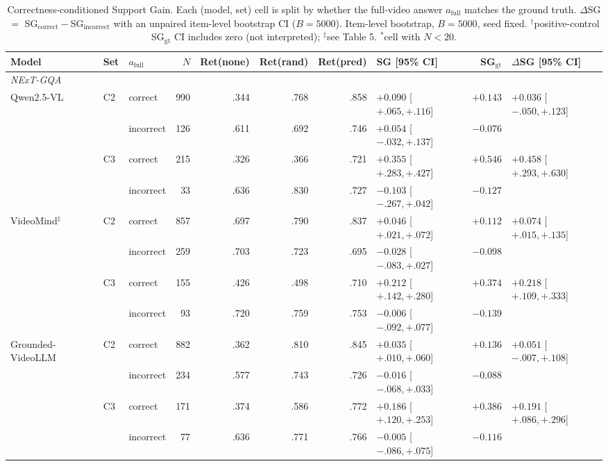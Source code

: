 \begin{table}[t]
\centering
\scriptsize
\setlength{\tabcolsep}{4pt}
\caption{Correctness-conditioned Support Gain. Each (model, set) cell is split by whether the full-video answer $a_{\text{full}}$ matches the ground truth. $\Delta$SG $=$ SG$_{\text{correct}}-$SG$_{\text{incorrect}}$ with an unpaired item-level bootstrap CI ($B{=}5000$). Item-level bootstrap, $B{=}5000$, seed fixed. $^{\dagger}$positive-control SG$_{\text{gt}}$ CI includes zero (not interpreted); $^{\ddagger}$see Table 5. $^{\ast}$cell with $N<20$.}
\label{tab:a1_correctness_conditioned}
\begin{tabular}{lllrrrrlrl}
\toprule
Model & Set & $a_{\text{full}}$ & $N$ & Ret(none) & Ret(rand) & Ret(pred) & SG [95\% CI] & SG$_{\text{gt}}$ & $\Delta$SG [95\% CI] \\
\midrule
\multicolumn{10}{l}{\textit{NExT-GQA}} \\
Qwen2.5-VL & C2 & correct & 990 & .344 & .768 & .858 & $+0.090$ [$+.065,+.116$] & $+0.143$ & $+0.036$ [$-.050,+.123$] \\
 &  & incorrect & 126 & .611 & .692 & .746 & $+0.054$ [$-.032,+.137$] & $-0.076$ &  \\
 & C3 & correct & 215 & .326 & .366 & .721 & $+0.355$ [$+.283,+.427$] & $+0.546$ & $+0.458$ [$+.293,+.630$] \\
 &  & incorrect & 33 & .636 & .830 & .727 & $-0.103$ [$-.267,+.042$] & $-0.127$ &  \\
\addlinespace
VideoMind$^{\ddagger}$ & C2 & correct & 857 & .697 & .790 & .837 & $+0.046$ [$+.021,+.072$] & $+0.112$ & $+0.074$ [$+.015,+.135$] \\
 &  & incorrect & 259 & .703 & .723 & .695 & $-0.028$ [$-.083,+.027$] & $-0.098$ &  \\
 & C3 & correct & 155 & .426 & .498 & .710 & $+0.212$ [$+.142,+.280$] & $+0.374$ & $+0.218$ [$+.109,+.333$] \\
 &  & incorrect & 93 & .720 & .759 & .753 & $-0.006$ [$-.092,+.077$] & $-0.139$ &  \\
\addlinespace
Grounded-VideoLLM & C2 & correct & 882 & .362 & .810 & .845 & $+0.035$ [$+.010,+.060$] & $+0.136$ & $+0.051$ [$-.007,+.108$] \\
 &  & incorrect & 234 & .577 & .743 & .726 & $-0.016$ [$-.068,+.033$] & $-0.088$ &  \\
 & C3 & correct & 171 & .374 & .586 & .772 & $+0.186$ [$+.120,+.253$] & $+0.386$ & $+0.191$ [$+.086,+.296$] \\
 &  & incorrect & 77 & .636 & .771 & .766 & $-0.005$ [$-.086,+.075$] & $-0.116$ &  \\

\end{tabular}
\end{table}
